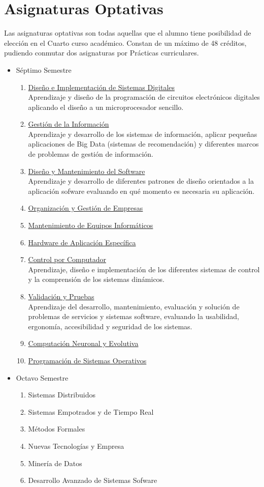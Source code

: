 \section{Asignaturas Optativas}
Las asignaturas optativas son todas aquellas que el alumno tiene posibilidad de elección en el Cuarto curso académico. Constan de un máximo de 48 créditos, pudiendo   conmutar dos asignaturas por Prácticas curriculares. 
\begin{itemize}
\item Séptimo Semestre
\begin{enumerate}
\item \underline{Diseño e Implementación de Sistemas Digitales}\\Aprendizaje y diseño de la programación de circuitos electrónicos digitales aplicando el diseño a un microprocesador sencillo. 
\item \underline{Gestión de la Información}\\Aprendizaje y desarrollo de los sistemas de información, aplicar pequeñas aplicaciones de Big Data (sistemas de recomendación) y diferentes marcos de problemas de gestión de información. 
\item \underline{Diseño y Mantenimiento del Software}\\Aprendizaje y desarrollo de diferentes patrones de diseño orientados a la aplicación sofware evaluando en qué momento es necesaria su aplicación. 
\item \underline{Organización y Gestión de Empresas}\\
\item \underline{Mantenimiento de Equipos Informáticos}
\item \underline{Hardware de Aplicación Específica }
\item \underline{Control por Computador}\\Aprendizaje, diseño e implementación de los diferentes sistemas de control y la comprensión de los sistemas dinámicos.
\item \underline{Validación y Pruebas}\\Aprendizaje del desarrollo, mantenimiento, evaluación y solución de problemas de servicios y sistemas software, evaluando la usabilidad, ergonomía, accesibilidad y seguridad de los sistemas. 
\item \underline{Computación Neuronal y Evolutiva}
\item \underline{Programación de Sistemas Operativos}
\end{enumerate}
\end{itemize}
\begin{itemize}
\item Octavo Semestre
\begin{enumerate}
\item Sistemas Distribuidos
\item Sistemas Empotrados y de Tiempo Real
\item Métodos Formales
\item Nuevas Tecnologías y Empresa
\item Minería de Datos
\item Desarrollo Avanzado de Sistemas Sofware
\end{enumerate}
\end{itemize}



